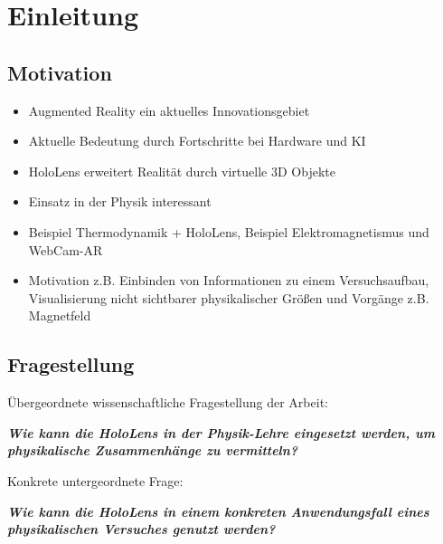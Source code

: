 \section{Einleitung}
\label{sec-1}

\subsection{Motivation}
\label{sec-1-1}
\begin{itemize}
	\item Augmented Reality ein aktuelles Innovationsgebiet
	\item Aktuelle Bedeutung durch Fortschritte bei Hardware und KI
	\item HoloLens erweitert Realität durch virtuelle 3D Objekte
	\item Einsatz in der Physik interessant
	\item Beispiel Thermodynamik + HoloLens, Beispiel Elektromagnetismus und WebCam-AR
	\item Motivation z.B. Einbinden von Informationen zu einem Versuchsaufbau, Visualisierung nicht sichtbarer physikalischer Größen und Vorgänge z.B. Magnetfeld
\end{itemize}

\subsection{Fragestellung}
\label{sec-1-2}
Übergeordnete wissenschaftliche Fragestellung der Arbeit:
\begin{center}
	\textit{\textbf{Wie kann die HoloLens in der Physik-Lehre eingesetzt werden, um physikalische Zusammenhänge zu vermitteln?}}
\end{center}

Konkrete untergeordnete Frage:
\begin{center}
	\textit{\textbf{Wie kann die HoloLens in einem konkreten Anwendungsfall eines physikalischen Versuches genutzt werden?}}
\end{center}

